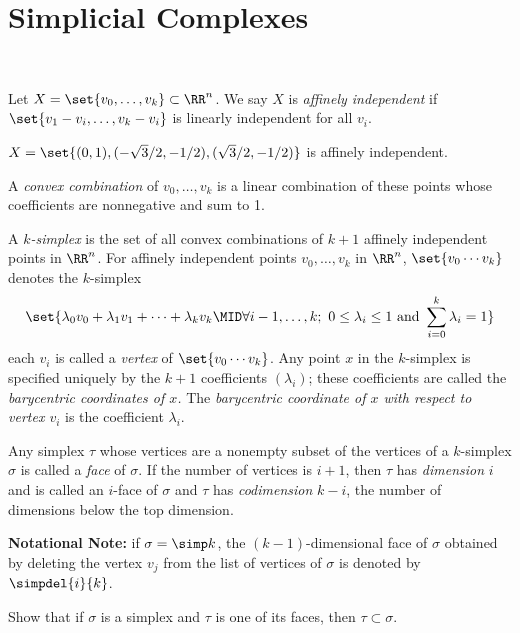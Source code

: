 \section{Simplicial Complexes}~
\begin{definition}
  Let $X = \set{v_0, \ldots, v_k} \subset \RR^n$. We say $X$ is \emph{affinely
    independent} if $\set{v_1 - v_i, \ldots, v_k - v_i}$ is linearly
  independent for all $v_i$.
\end{definition}
\begin{example}
  $X = \set{(0,1), (-\sqrt{3}/2, -1/2), (\sqrt{3}/2, -1/2)}$ is affinely
  independent.
\end{example}
\begin{definition}
  A \emph{convex combination} of $v_0, \ldots, v_k$ is a linear combination
  of these points whose coefficients are nonnegative and sum to 1.
\end{definition}
\begin{definition}
  A \emph{$k$-simplex} is the set of all convex combinations of $k+1$ affinely
  independent points in $\RR^n$. For affinely independent points $v_0, \ldots,
  v_k$ in $\RR^n$, $\set{v_0\cdots v_k}$ denotes the $k$-simplex
  \[
    \set{\lambda_0 v_0 + \lambda_1v_1 + \cdots + \lambda_kv_k \MID \forall i -
      1, \ldots, k;\ 0 \leq \lambda_i \leq 1 \text{ and } \sum_{i=0}^k \lambda_i
    = 1}
  \]
  each $v_i$ is called a \emph{vertex} of $\set{v_0 \cdots v_k}$. Any point $x$
  in the $k$-simplex is specified uniquely by the $k+1$ coefficients
  $(\lambda_i)$; these coefficients are called the \emph{barycentric coordinates
    of $x$.} The \emph{barycentric coordinate of $x$ with respect to vertex
    $v_i$} is the coefficient $\lambda_i$.
\end{definition}
\begin{definition}
  Any simplex $\tau$ whose vertices are a nonempty subset of the vertices of a
  $k$-simplex $\sigma$ is called a \emph{face} of $\sigma$. If the number of
  vertices is $i+1$, then $\tau$ has \emph{dimension} $i$ and is called an
  $i$-face of $\sigma$ and $\tau$ has \emph{codimension} $k-i$, the number of
  dimensions below the top dimension.
\end{definition}
\textbf{Notational Note:} if $\sigma = \simp k$, the $(k-1)$-dimensional face of
$\sigma$ obtained by deleting the vertex $v_j$ from the list of vertices of
$\sigma$ is denoted by $\simpdel{i}{k}$.
\begin{problem}[15.11]
  Show that if $\sigma$ is a simplex and $\tau$ is one of its faces, then $\tau
  \subset \sigma$.
\end{problem}
